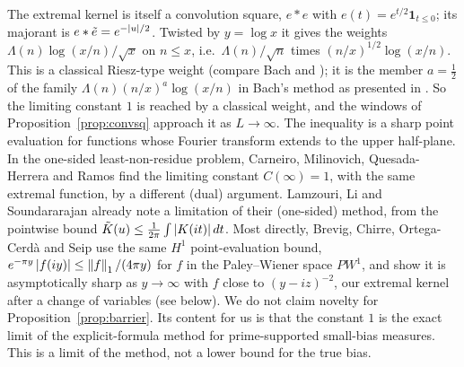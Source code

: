 The extremal kernel is itself a convolution square, $e*e$ with $e(t)=e^{t/2}\mathbf 1_{t\le0}$; its majorant is $e*\tilde e=e^{-\left\lvert u \right\rvert/2}$.
Twisted by $y=\log x$ it gives the weights $\Lambda(n)\log(x/n)/\sqrt x$ on $n\le x$, i.e.\ $\Lambda(n)/\sqrt n$ times
$(n/x)^{1/2}\log(x/n)$. This is a classical Riesz-type weight (compare Bach \cite{bach1990} and \cite[Lemma~2.2]{lls2015}); it is the
member $a=\frac12$ of the family $\Lambda(n)(n/x)^a\log(x/n)$ in Bach's method as presented in \cite{mcgowntrevino2021}.
So the limiting constant $1$ is reached by a classical weight, and the windows of Proposition~\ref{prop:convsq} approach it as $L\to\infty$.
The inequality is a sharp point evaluation for functions whose Fourier transform extends to the upper half-plane. In the one-sided
least-non-residue problem, Carneiro, Milinovich, Quesada-Herrera and Ramos \cite{cmqr2024} find the limiting constant $C(\infty)=1$, with
the same extremal function, by a different (dual) argument. Lamzouri, Li and Soundararajan
\cite[\S6.1]{lls2015} already note a limitation of their (one-sided) method, from the pointwise bound
$\tilde K(u)\le\frac1{2\pi}\int\left\lvert K(it) \right\rvert dt$. Most directly, Brevig, Chirre, Ortega-Cerd\`a and Seip \cite[\S9.2]{bcos2024} use the same
$H^1$ point-evaluation bound, $e^{-\pi y}\left\lvert f(iy) \right\rvert\le\left\lVert f \right\rVert_1/(4\pi y)$ for $f$ in the Paley--Wiener space $PW^1$, and show it is
asymptotically sharp as $y\to\infty$ with $f$ close to $(y-iz)^{-2}$, our extremal kernel after a change of variables (see below).
We do not claim novelty for Proposition~\ref{prop:barrier}. Its content for us is
that the constant $1$ is the exact limit of the explicit-formula method for prime-supported small-bias measures. This is a limit of
the method, not a lower bound for the true bias.


